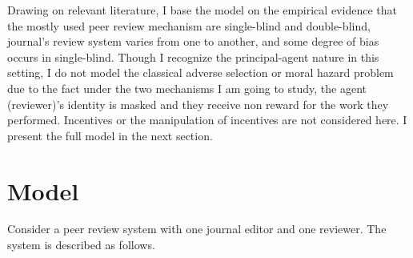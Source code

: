 \documentclass[12pt]{article}
\begin{document}
Drawing on relevant literature, I base the model on the empirical evidence that
the mostly used peer review mechanism are single-blind and double-blind,
journal's review system varies from one to another, and some degree of bias
occurs in single-blind. Though I recognize the principal-agent nature in this
setting, I do not model the classical adverse selection or moral hazard problem
due to the fact under the two mechanisms I am going to study, the agent
(reviewer)'s identity is masked and they receive non reward for the work they
performed. Incentives or the manipulation of incentives are not considered
here. I present the full model in the next section.
\section{Model} \label{sec:model}
Consider a peer review system with one journal editor and one reviewer. The
system is described as follows.
\end{document}
